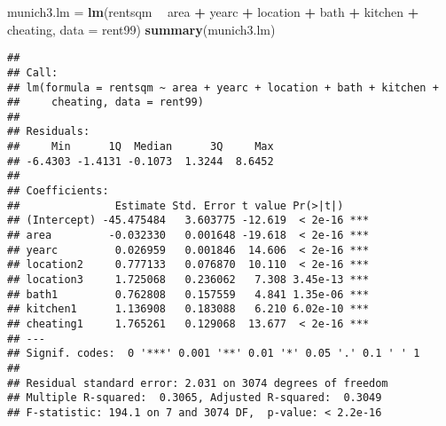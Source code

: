 \documentclass[ignorenonframetext,]{beamer}
\newenvironment{Shaded}{\begin{snugshade}}{\end{snugshade}}
\newcommand{\KeywordTok}[1]{\textcolor[rgb]{0.13,0.29,0.53}{\textbf{#1}}}
\newcommand{\DataTypeTok}[1]{\textcolor[rgb]{0.13,0.29,0.53}{#1}}
\newcommand{\StringTok}[1]{\textcolor[rgb]{0.31,0.60,0.02}{#1}}
\newcommand{\OperatorTok}[1]{\textcolor[rgb]{0.81,0.36,0.00}{\textbf{#1}}}
\newcommand{\NormalTok}[1]{#1}
\begin{document}
\begin{frame}[fragile]

\footnotesize

\begin{Shaded}
\begin{Highlighting}[]
\NormalTok{munich3.lm =}\StringTok{ }\KeywordTok{lm}\NormalTok{(rentsqm }\OperatorTok{~}\StringTok{ }\NormalTok{area }\OperatorTok{+}\StringTok{ }\NormalTok{yearc }\OperatorTok{+}\StringTok{ }\NormalTok{location }\OperatorTok{+}\StringTok{ }\NormalTok{bath }\OperatorTok{+}\StringTok{ }\NormalTok{kitchen }\OperatorTok{+}\StringTok{ }
\StringTok{    }\NormalTok{cheating, }\DataTypeTok{data =}\NormalTok{ rent99)}
\KeywordTok{summary}\NormalTok{(munich3.lm)}
\end{Highlighting}
\end{Shaded}

\begin{verbatim}
## 
## Call:
## lm(formula = rentsqm ~ area + yearc + location + bath + kitchen + 
##     cheating, data = rent99)
## 
## Residuals:
##     Min      1Q  Median      3Q     Max 
## -6.4303 -1.4131 -0.1073  1.3244  8.6452 
## 
## Coefficients:
##               Estimate Std. Error t value Pr(>|t|)    
## (Intercept) -45.475484   3.603775 -12.619  < 2e-16 ***
## area         -0.032330   0.001648 -19.618  < 2e-16 ***
## yearc         0.026959   0.001846  14.606  < 2e-16 ***
## location2     0.777133   0.076870  10.110  < 2e-16 ***
## location3     1.725068   0.236062   7.308 3.45e-13 ***
## bath1         0.762808   0.157559   4.841 1.35e-06 ***
## kitchen1      1.136908   0.183088   6.210 6.02e-10 ***
## cheating1     1.765261   0.129068  13.677  < 2e-16 ***
## ---
## Signif. codes:  0 '***' 0.001 '**' 0.01 '*' 0.05 '.' 0.1 ' ' 1
## 
## Residual standard error: 2.031 on 3074 degrees of freedom
## Multiple R-squared:  0.3065, Adjusted R-squared:  0.3049 
## F-statistic: 194.1 on 7 and 3074 DF,  p-value: < 2.2e-16
\end{verbatim}

\normalsize

\end{frame}
\end{document}
